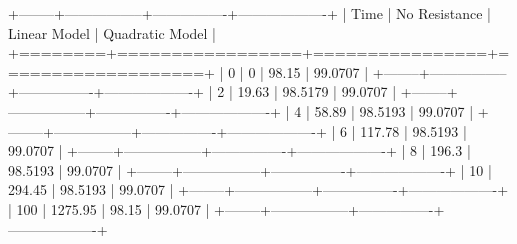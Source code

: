 \documentclass[12pt,letterpaper]{article}
\author{Shawn Hartley}
\begin{document}
\maketitle

+--------+-----------------+----------------+-------------------+
|   Time |   No Resistance |   Linear Model |   Quadratic Model |
+========+=================+================+===================+
|      0 |            0    |        98.15   |           99.0707 |
+--------+-----------------+----------------+-------------------+
|      2 |           19.63 |        98.5179 |           99.0707 |
+--------+-----------------+----------------+-------------------+
|      4 |           58.89 |        98.5193 |           99.0707 |
+--------+-----------------+----------------+-------------------+
|      6 |          117.78 |        98.5193 |           99.0707 |
+--------+-----------------+----------------+-------------------+
|      8 |          196.3  |        98.5193 |           99.0707 |
+--------+-----------------+----------------+-------------------+
|     10 |          294.45 |        98.5193 |           99.0707 |
+--------+-----------------+----------------+-------------------+
|    100 |         1275.95 |        98.15   |           99.0707 |
+--------+-----------------+----------------+-------------------+
\end{document}
